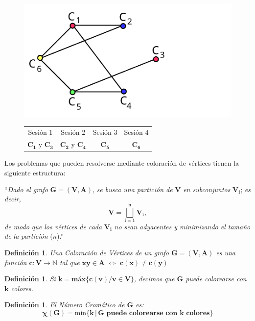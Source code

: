 \documentclass[ebook,oneside]{memoir}
\newtheorem{defn}[thm]{Definición}
\newcommand{\bolds}[1]{\boldsymbol{#1}}
\begin{document}
           \begin{figure}[h!]\centering
           \includegraphics[scale=0.3]{color6.pdf}
           \begin{tabular}{cccc}
                  Sesi\'{o}n 1 & Sesi\'{o}n 2 & Sesi\'{o}n 3 & Sesi\'{o}n 4 \\
                  $\bolds{C_1}$ y $\bolds{C_3}$ & $\bolds{C_2}$ y $\bolds{C_4}$ & $\bolds{C_5}$ & $\bolds{C_6}$
            \end{tabular}
           \end{figure}

Los problemas que pueden resolverse mediante coloraci\'{o}n de v\'{e}rtices tienen la siguiente estructura:
\vspace{0.2cm}

``\emph{Dado el grafo} $\bolds{G=(V,A)}$, \emph{se busca una partici\'{o}n de }$\bolds{V}$ \emph{en subconjuntos }$\bolds{V_i}$; \emph{es decir,}
$$\bolds{V=\bigsqcup_{i=1}^{n}V_i},$$ \emph{de modo que los v\'{e}rtices de cada} $\bolds{V_i}$ \emph{no sean adyacentes y minimizando el tama\~{n}o de la partici\'{o}n }($n$).''
\vspace{0.4cm}

\begin{defn}
Una Coloraci\'{o}n de V\'{e}rtices de un grafo $\bolds{G=(V,A)}$ es una funci\'{o}n $\bolds{c:V\rightarrow\mathbb{N}}$ tal que
$\bolds{xy\in A\,\,\Leftrightarrow\,\,c(x)\neq c(y)}$
\end{defn}

\begin{defn}
Si $\bolds{k=\mbox{m\'{a}x}\{c(v)/v\in V\}}$, decimos que  $\bolds{G}$ puede colorearse con $\bolds{k}$ colores.
\end{defn}

\begin{defn}
El N\'{u}mero Crom\'{a}tico de $\bolds{G}$ es:
        $$\bolds{\chi(G)=\mathrm{min}\{k\,|\,G \mbox{ puede colorearse con } k \mbox{ colores}\}}$$
\end{defn}
\end{document}
